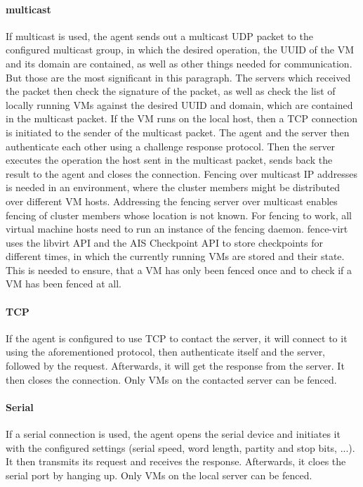 \paragraph{multicast}
If multicast is used, the agent sends out a multicast UDP packet
to the configured multicast group, in which the desired operation, the \ac{UUID}
of the \ac{VM} and its domain are contained, as well as other things needed
for communication. But those are the most significant in this paragraph.
The servers which received the packet then check the signature
of the packet, as well as check the list of locally running \acp{VM} against 
the desired \ac{UUID} and domain, which are contained in the multicast packet.
If the \ac{VM} runs on the local host, then a \ac{TCP} connection
is initiated to the sender of the multicast packet. The agent
and the server then authenticate each other using a challenge response protocol.
Then the server executes the operation the host sent in the multicast packet,
sends back the result to the agent and closes the connection.
Fencing over multicast IP addresses is needed in an environment, where the cluster members might
be distributed over different \ac{VM} hosts. Addressing the fencing server
over multicast enables fencing of cluster members whose location is not known.
For fencing to work, all virtual machine hosts need to run an instance of
the fencing daemon.
fence-virt uses the libvirt \ac{API} and the \ac{AIS} Checkpoint \ac{API} to
store checkpoints for different times, in which the currently running \acp{VM}
are stored and their state. This is needed to ensure, that a \ac{VM} has only
been fenced once and to check if a \ac{VM} has been fenced at all.
\paragraph{TCP}
If the agent is configured to use \ac{TCP} to contact the server,
it will connect to it using the aforementioned protocol, then authenticate itself and the server,
followed by the request. Afterwards, it will get the response from the server. It
then closes the connection. Only \acp{VM} on the contacted server can be fenced.
\paragraph{Serial}
If a serial connection is used, the agent opens the serial device and initiates it with the
configured settings (serial speed, word length, partity and stop bits, ...).
It then transmits its request and receives the response. Afterwards, it cloes the
serial port by hanging up. Only \acp{VM} on the local server can be fenced.
